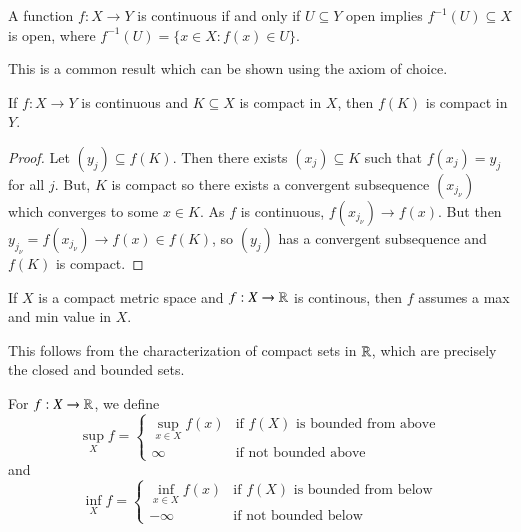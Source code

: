 \begin{prop}\label{prop:3.1.1}
    A function $f:X\rightarrow Y$ is continuous if and only if $U \subseteq Y$ open implies $f^{-1}(U) \subseteq X$ is open, where $f^{-1}(U) = \{x \in X:f(x) \in U\}$.
\end{prop}

This is a common result which can be shown using the axiom of choice.

\begin{prop}\label{prop:3.1.2}
    If $f:X\rightarrow Y$ is continuous and $K \subseteq X$ is compact in $X$, then $f(K)$ is compact in $Y$.
\end{prop}
\begin{proof}
    Let $(y_j) \subseteq f(K)$. Then there exists $(x_j) \subseteq K$ such that $f(x_j) = y_j$ for all $j$. But, $K$ is compact so there exists a convergent subsequence $(x_{j_{\nu}})$ which converges to some $x \in K$. As $f$ is continuous, $f(x_{j_{\nu}})\rightarrow f(x)$. But then $y_{j_{\nu}} = f(x_{j_{\nu}})\rightarrow f(x) \in f(K)$, so $(y_j)$ has a convergent subsequence and $f(K)$ is compact.
\end{proof}

\begin{prop}\label{prop:3.1.3}
    If $X$ is a compact metric space and $f:X\rightarrow \mathbb R$ is continous, then $f$ assumes a max and min value in $X$.
\end{prop}
This follows from the characterization of compact sets in $\mathbb R$, which are precisely the closed and bounded sets.

\begin{defn}
    For $f:X\rightarrow \mathbb R$, we define \begin{equation*}
        \sup_{X}f = \left\{\begin{array}{cc} \sup_{x\in X}f(x) & \text{if $f(X)$ is bounded from above} \\ \infty & \text{if not bounded above} \end{array}\right.
    \end{equation*}
    and \begin{equation*}
        \inf_{X}f = \left\{\begin{array}{cc} \inf_{x\in X}f(x) & \text{if $f(X)$ is bounded from below} \\ -\infty & \text{if not bounded below} \end{array}\right.
    \end{equation*}
\end{defn}

